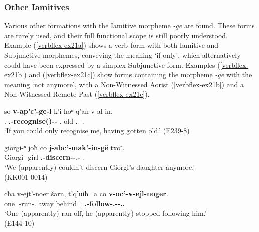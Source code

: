\subsubsection{Other Iamitives}

Various other formations with the Iamitive morpheme \textit{-ge} are found. These forms are rarely used, and their full functional scope is still poorly understood. Example (\ref{verbflex-ex21a}) shows a verb form with both Iamitive and Subjunctive morphemes, conveying the meaning `if only', which alternatively could have been expressed by a simplex Subjunctive form. Examples (\ref{verbflex-ex21b}) and (\ref{verbflex-ex21c}) show forms containing the morpheme \textit{-ge} with the meaning `not anymore', with a Non-Witnessed Aorist (\ref{verbflex-ex21b}) and a Non-Witnessed Remote Past (\ref{verbflex-ex21c}).

\begin{exe}
	\ex\label{verbflex-ex21}
	\begin{xlist}
		
		
			\ex\label{verbflex-ex21a}
			\gll so \textbf{v-ap'c'-ge-l} k'i ħoⁿ q'an-v-al-in. \\
			{\Fsg}.{\Nom} \textbf{{\M}.{\Sg}-recognise({\Npst})-{\Iam}-{\Sbjv}} {\Contr} {\Ssg}.{\Dat} old-{\M}.{\Sg}-{\Intr}-{\Ptcp}.{\Pst} \\
			\trans `If you could only recognise me, having gotten old.'
			\hfill (E239-8)
		
		
		
		
			\ex\label{verbflex-ex21b}
			\gll giorgi-ⁿ joħ co \textbf{j-abc'-mak'-in-g\u{e}} txoⁿ.  \\
			Giorgi-{\Gen} girl {\Neg} \textbf{{\F}.{\Sg}-discern-{\Pot}-{\Nw}.{\Aor}-{\Iam}} {\Fpl}.{\Dat} \\
			\trans `We (apparently) couldn't discern Giorgi's daughter anymore.' \\
			\hfill (KK001-0014)
		
		
		
			\ex\label{verbflex-ex21c}
			\gll cħa v-ejt'-noer šarn, t'q'uiħ=a co \textbf{v-oc'-v-ejl-noger}. \\
			one {\M}.{\Sg}-run-{\Nw}.{\Rem} away behind={\Emph} {\Neg} \textbf{{\M}.{\Sg}-follow-{\M}.{\Sg}-{\Intr}-{\Nw}.{\Rem}.{\Iam}} \\
			\trans `One (apparently) ran off, he (apparently) stopped following him.' \\
			\hfill (E144-10)
		
		
	\end{xlist}
\end{exe}


